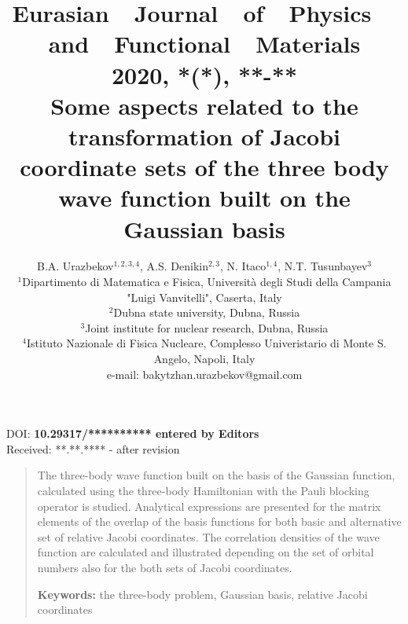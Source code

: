 \documentclass[12pt,a4paper,twoside]{article}
\begin{document}

\newenvironment{sciabstract}{
\begin{quote} \scriptsize}
{\end{quote}}

\pretitle{\begin{center}\Huge\bfseries} %

\title{{\normalsize{Eurasian~~Journal~~of~~Physics~~and~~Functional~~Materials\\ 
2020, \textbf{*}(*),   **-**}} \\[2.0cm]%
Some aspects related to the transformation of Jacobi coordinate sets  of the three body wave function built on the Gaussian basis}%

\author
{B.A. Urazbekov$^{1,2,3,4}$, A.S. Denikin$^{2,3}$, N. Itaco$^{1,4}$, N.T. Tusunbayev$^3$\\ 
\scriptsize{$^1$Dipartimento di Matematica e Fisica, Universit\`a degli Studi della Campania "Luigi Vanvitelli", Caserta, Italy }\\
\scriptsize{$^2$Dubna state university, Dubna, Russia}\\
\scriptsize{$^3$Joint institute for nuclear research, Dubna, Russia}\\
\scriptsize{$^4$Istituto Nazionale di Fisica Nucleare, Complesso Univeristario di Monte S. Angelo, Napoli, Italy}\\
\scriptsize{e-mail: bakytzhan.urazbekov@gmail.com}\\%
}

\date{}%
\maketitle

\begin{flushleft}
\scriptsize{ DOI: \textbf{ 10.29317/********** entered by Editors}\\
Received: **.**.**** - after revision}

\end{flushleft} 

\begin{sciabstract}%

The three-body wave function built on the basis of the Gaussian function, calculated using the three-body Hamiltonian with the Pauli blocking operator is studied. Analytical expressions are presented for the matrix elements of the overlap of the basis functions for both basic and alternative set of relative Jacobi coordinates. The correlation densities of the wave function are calculated and illustrated depending on the set of orbital numbers also for the both sets of Jacobi coordinates.


{\textbf{Keywords:} the three-body problem, Gaussian basis, relative Jacobi coordinates}

\end{sciabstract}
\end{document}
